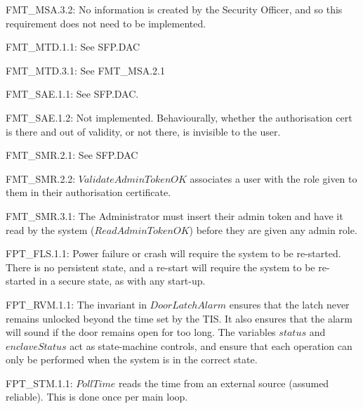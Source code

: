 {\footnotesize \sf 
FMT\_MSA.3.2:
}
\newline
	No information is created by the Security Officer, and so this requirement does not need to be implemented.

{\footnotesize \sf 
FMT\_MTD.1.1:
}
\newline
	See SFP.DAC

{\footnotesize \sf 
FMT\_MTD.3.1:
}
\newline
	See FMT\_MSA.2.1

{\footnotesize \sf 
FMT\_SAE.1.1:
}
\newline
        See SFP.DAC.

{\footnotesize \sf 
FMT\_SAE.1.2:
}
\newline
	Not implemented. Behaviourally, whether the authorisation cert is there and out of validity, or not there, is invisible to the user.

{\footnotesize \sf 
FMT\_SMR.2.1:
}
\newline
	See SFP.DAC

{\footnotesize \sf 
FMT\_SMR.2.2:
}
\newline
	$ValidateAdminTokenOK$ associates a user with the role given to them in their authorisation certificate.

{\footnotesize \sf 
FMT\_SMR.3.1:
}
\newline
	The Administrator must insert their admin token and have it read by the system ($ReadAdminTokenOK$) before they are given any admin role.

{\footnotesize \sf 
FPT\_FLS.1.1:
}
\newline
	Power failure or crash will require the system to be re-started. There is no persistent state, and a re-start will require the system to be re-started in a secure state, as with any start-up.

{\footnotesize \sf 
FPT\_RVM.1.1:
}
\newline
	The invariant in $DoorLatchAlarm$ ensures that the latch never
	remains unlocked beyond the time set by the TIS. It also
	ensures that the alarm will sound if the door remains open for
	too long. 
	The variables $status$ and $enclaveStatus$ act as state-machine
	controls, and ensure that each operation can only be performed
	when the system is in the correct state. 

{\footnotesize \sf 
FPT\_STM.1.1:
}
\newline
	$PollTime$ reads the time from an external source (assumed
	reliable). This is done once per main loop. 

